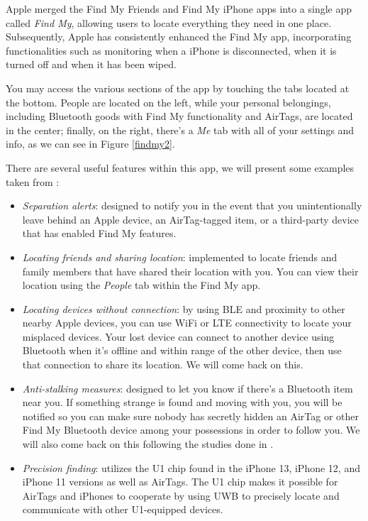 \documentclass[english]{article}
\begin{document}
Apple merged the Find My Friends and Find My iPhone apps into a single app called \textit{Find My}, allowing users to locate everything they need in one place. Subsequently, Apple has consistently enhanced the Find My app, incorporating functionalities such as monitoring when a iPhone is disconnected, when it is turned off and when it has been wiped.

You may access the various sections of the app by touching the tabs located at the bottom. People are located on the left, while your personal belongings, including Bluetooth goods with Find My functionality and AirTags, are located in the center; finally, on the right, there's a \textit{Me} tab with all of your settings and info, as we can see in Figure \ref{findmy2}.

There are several useful features within this app, we will present some examples taken from \cite{Clover_2022}:
\begin{itemize}
  \item \textit{Separation alerts}: designed to notify you in the event that you unintentionally leave behind an Apple device, an AirTag-tagged item, or a third-party device that has enabled Find My features.
  \item \textit{Locating friends and sharing location}: implemented to locate friends and family members that have shared their location with you. You can view their location using the \textit{People} tab within the Find My app.
  \item \textit{Locating devices without connection}: by using BLE and proximity to other nearby Apple devices, you can use WiFi or LTE connectivity to locate your misplaced devices. Your lost device can connect to another device using Bluetooth when it's offline and within range of the other device, then use that connection to share its location. We will come back on this.
  \item \textit{Anti-stalking measures}: designed to let you know if there's a Bluetooth item near you. If something strange is found and moving with you, you will be notified so you can make sure nobody has secretly hidden an AirTag or other Find My Bluetooth device among your possessions in order to follow you. We will also come back on this following the studies done in \cite{airguard}.
  \item \textit{Precision finding}: utilizes the U1 chip found in the iPhone 13, iPhone 12, and iPhone 11 versions as well as AirTags. The U1 chip makes it possible for AirTags and iPhones to cooperate by using UWB to precisely locate and communicate with other U1-equipped devices.
\end{itemize}
\end{document}
